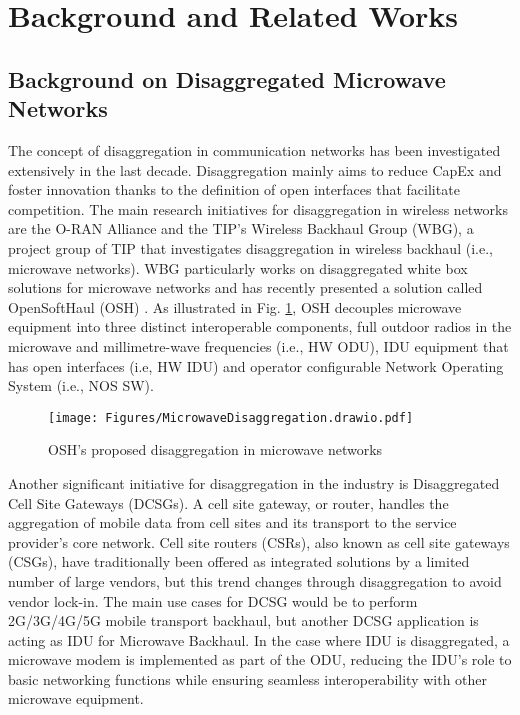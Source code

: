 \section{Background and Related Works}
\subsection{Background on Disaggregated Microwave Networks}
\label{subsec:dissmic}
The concept of disaggregation in communication networks has been investigated extensively in the last decade. Disaggregation mainly aims to reduce CapEx and foster innovation thanks to the definition of open interfaces that facilitate competition. The main research initiatives for disaggregation in wireless networks are the O-RAN Alliance and the TIP’s Wireless Backhaul Group (WBG), a project group of TIP that investigates disaggregation in wireless backhaul (i.e., microwave networks). WBG particularly works on disaggregated white box solutions for microwave networks and has recently presented a solution called OpenSoftHaul (OSH) \cite{TIP_Wireless_Backhaul}. As illustrated in Fig. \ref{fig:microwavedisaggregated}, OSH decouples microwave equipment into three distinct interoperable components, full outdoor radios in the microwave and millimetre-wave frequencies (i.e., HW ODU), IDU equipment that has open interfaces (i.e, HW IDU) and operator configurable Network Operating System (i.e., NOS SW).
\begin{figure}[t]
	\centering
	\texttt{[image: Figures/MicrowaveDisaggregation.drawio.pdf]}
	\caption{OSH's proposed disaggregation in microwave networks}
	\label{fig:microwavedisaggregated}
        \vspace{-20pt}
\end{figure}
Another significant initiative for disaggregation in the industry is Disaggregated Cell Site Gateways (DCSGs). A cell site gateway, or router, handles the aggregation of mobile data from cell sites and its transport to the service provider’s core network. Cell site routers (CSRs), also known as cell site gateways (CSGs), have traditionally been offered as integrated solutions by a limited number of large vendors, but this trend changes through disaggregation to avoid vendor lock-in. The main use cases for DCSG would be to perform 2G/3G/4G/5G mobile transport backhaul, but another DCSG  application is acting as IDU for Microwave Backhaul. In the case where IDU is disaggregated, a microwave modem is implemented as part of the ODU, reducing the IDU’s role to basic networking functions while ensuring seamless interoperability with other microwave equipment\cite{TelecomInfraProject2019}. 

